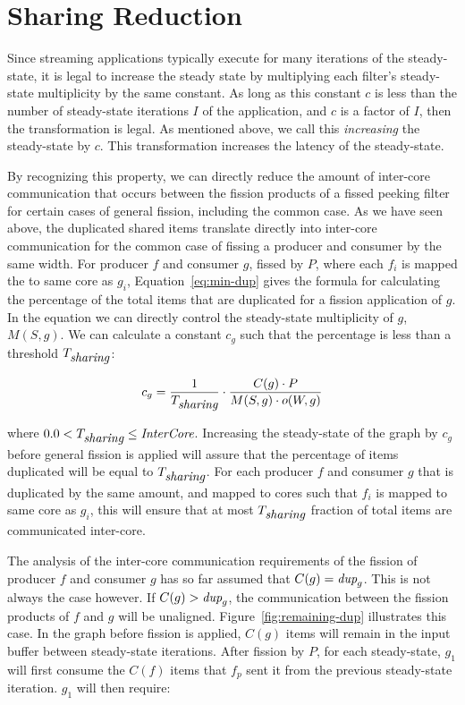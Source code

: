 \section{Sharing Reduction}

Since streaming applications typically execute for
many iterations of the steady-state, it is legal to increase the
steady state by multiplying each filter's steady-state multiplicity by
the same constant.  As long as this constant $c$ is less than the number
of steady-state iterations $I$ of the application, and $c$ is a factor of
$I$, then the transformation is legal.  As mentioned above, we call
this {\it increasing} the steady-state by $c$.  This transformation
increases the latency of the steady-state.

By recognizing this property, we can directly reduce the amount of
inter-core communication that occurs between the fission products of a
fissed peeking filter for certain cases of general fission, including
the common case.  As we have seen above, the duplicated shared items
translate directly into inter-core communication for the common case
of fissing a producer and consumer by the same width.  For producer
$f$ and consumer $g$, fissed by $P$, where each $f_i$ is mapped the to
same core as $g_i$, Equation~\ref{eq:min-dup} gives the formula for
calculating the percentage of the total items that are duplicated for
a fission application of $g$.  In the equation we can directly control
the steady-state multiplicity of $g$, $M(S,g)$.  We can calculate a
constant $c_g$ such that the percentage is less than a threshold
$T_{\mbox{\it sharing}}$:

\begin{equation}
\label{eq:ic-thresh}
c_g = \frac{1}{T_{\mbox{\it sharing}}} \cdot \frac{C(g) \cdot P}{M(S,g) \cdot o(W,g)}
\end{equation}

\noindent where $0.0 < T_{\mbox{\it sharing}} \le \mbox{\it InterCore}$. Increasing the
steady-state of the graph by $c_g$ before general fission is applied
will assure that the percentage of items duplicated will be equal to
$T_{\mbox{\it sharing}}$.  For each producer $f$ and consumer $g$ that is
duplicated by the same amount, and mapped to cores such that $f_i$ is
mapped to same core as $g_i$, this will ensure that at most
$T_{\mbox{\it sharing}}$ fraction of total items are communicated inter-core.

The analysis of the inter-core communication requirements of the
fission of producer $f$ and consumer $g$ has so far assumed that $C(g)
= \mbox{\it dup}_g $.  This is not always the case however.  If $C(g) >
\mbox{\it dup}_g$, the communication between the fission products of $f$ and
$g$ will be unaligned.  Figure~\ref{fig:remaining-dup} illustrates
this case.  In the graph before fission is applied, $C(g)$ items will
remain in the input buffer between steady-state iterations.  After
fission by $P$, for each steady-state, $g_1$ will first consume the
$C(f)$ items that $f_p$ sent it from the previous steady-state
iteration.  $g_1$ will then require:

